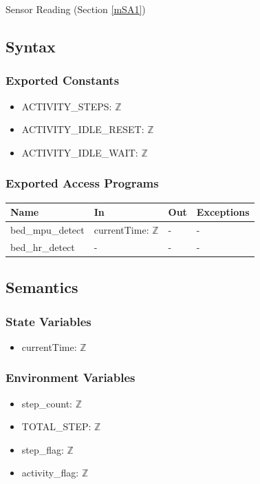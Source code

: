 \documentclass[12pt, titlepage]{article}
\begin{document}
Sensor Reading (Section \ref{mSA1})

\subsection{Syntax}

\subsubsection{Exported Constants}
\begin{itemize}
\item ACTIVITY\_STEPS: $\mathbb{Z}$
\item ACTIVITY\_IDLE\_RESET: $\mathbb{Z}$
\item ACTIVITY\_IDLE\_WAIT: $\mathbb{Z}$
\end{itemize}

\subsubsection{Exported Access Programs}

\begin{center}
\begin{tabular}{p{4cm} p{1cm} p{4cm} p{4cm}}
\hline
\textbf{Name} & \textbf{In} & \textbf{Out} & \textbf{Exceptions} \\
\hline
bed\_mpu\_detect & currentTime: $\mathbb{Z}$ & - & - \\
bed\_hr\_detect & - & - & - \\
\hline
\end{tabular}
\end{center}

\subsection{Semantics}

\subsubsection{State Variables}
\begin{itemize}
\item currentTime: $\mathbb{Z}$
\end{itemize}

\subsubsection{Environment Variables}
\begin{itemize}
\item step\_count: $\mathbb{Z}$
\item TOTAL\_STEP: $\mathbb{Z}$
\item step\_flag: $\mathbb{Z}$
\item activity\_flag: $\mathbb{Z}$
\end{itemize}
\end{document}
